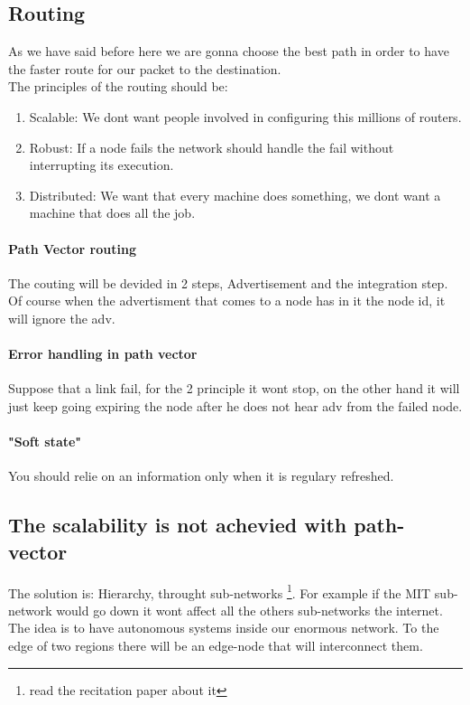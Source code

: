 \documentclass{article}
\begin{document}
    \subsection{Routing}
      As we have said before here we are gonna choose the best path in order to have
      the faster route for our packet to the destination. \\ The principles of the routing should be:
      \begin{enumerate}
        \item Scalable: We dont want people involved in configuring this millions 
          of routers.
        \item Robust: If a node fails the network should handle the fail without 
          interrupting its execution.
        \item Distributed: We want that every machine does something, we dont want a machine
          that does all the job.
      \end{enumerate}
    \paragraph{Path Vector routing} The couting will be devided in 2 steps, Advertisement and 
      the integration step. Of course when the advertisment that comes to a node has in it 
      the node id, it will ignore the adv.
    \paragraph{Error handling in path vector} Suppose that a link fail, for the 2 principle 
      it wont stop, on the other hand it will just keep going expiring the node after he does
      not hear adv from the failed node.
    \paragraph{"Soft state"} You should relie on an information only when it is regulary
      refreshed.
  \subsection{The scalability is not achevied with path-vector}
    The solution is: Hierarchy, throught sub-networks \footnote{read the recitation paper about
    it}. For example if the MIT sub-network would go down it wont affect all the others 
    sub-networks the internet. The idea is to have autonomous systems inside our enormous
    network. To the edge of two regions there will be an edge-node that will interconnect them.
\end{document}
